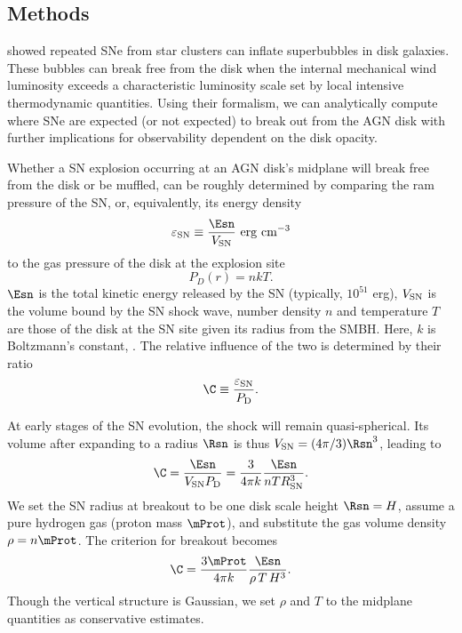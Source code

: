 \subsection{Methods}
\label{sec:methods-ch3}




\citet{MacLowMcCray88} showed repeated SNe from star clusters can inflate superbubbles in disk galaxies.
These bubbles can break free from the disk when the internal mechanical wind luminosity exceeds a characteristic luminosity scale set by local intensive thermodynamic quantities.
Using their formalism, we can analytically compute where SNe are expected (or not expected) to break out from the AGN disk with further implications for observability dependent on the disk opacity.

Whether a SN explosion occurring at an AGN disk's midplane will break free from the disk or be muffled, can be roughly determined by comparing the ram pressure of the SN, or, equivalently, its energy density
\begin{equation}
    \varepsilon_{\rm SN} \equiv \frac{\Esn}{V_{\rm SN}}\ {\rm erg\ cm^{-3}}
\end{equation}
to the gas pressure of the disk at the explosion site
\begin{equation}
    P_D(r) = n k T.
\end{equation}
$\Esn$ is the total kinetic energy released by the SN (typically, $10^{51}$ erg), $V_{\rm SN}$ is the volume bound by the SN shock wave, number density $n$ and temperature $T$ are those of the disk at the SN site given its radius from the SMBH.
Here, $k$ is Boltzmann's constant, .
The relative influence of the two is determined by their ratio
\begin{equation}
    \C \equiv \frac{\varepsilon_{\rm SN}}{P_{\rm D}}.
\end{equation}

At early stages of the SN evolution, the shock will remain quasi-spherical.
Its volume after expanding to a radius $\Rsn$ is thus $V_{\rm SN} = (4\pi/3) \Rsn^3$, leading to
\begin{equation}
    \C = \frac{\Esn}{V_{\rm SN}P_{\rm D}} = \frac{3}{4\pi k} \frac{\Esn}{n T R_{\rm SN}^3}.
\end{equation}
We set the SN radius at breakout to be one disk scale height $\Rsn=H$, assume a pure hydrogen gas (proton mass $\mProt$), and substitute the gas volume density $\rho=n\mProt$. The criterion for breakout becomes 
\begin{equation} \label{eqn:C}
    \C = \frac{3\mProt}{4\pi k}\frac{\Esn}{\rho \,T\,H^3}.
\end{equation}
Though the vertical structure is Gaussian, we set $\rho$ and $T$ to the midplane quantities as conservative estimates.


